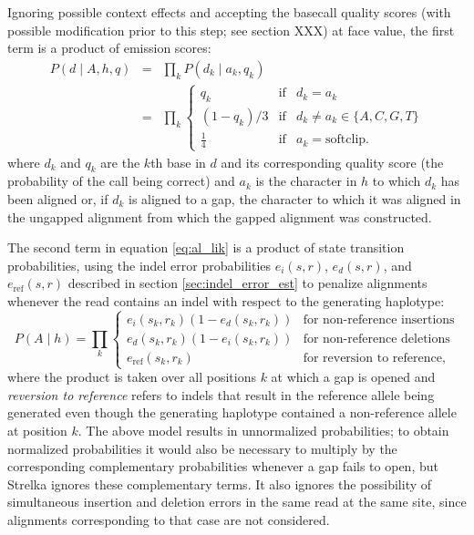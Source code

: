 \documentclass{article}
\begin{document}
Ignoring possible context effects and accepting the basecall quality scores (with possible modification prior to this step; see section XXX) at face value, the first term is a product of emission scores:
\begin{eqnarray*}
P(d \mid A,h,q) & = & \prod_k P(d_k \mid a_k,q_k)\\
& = & \prod_k \left\{
                        \begin{array}{lcl}
                             q_k & \mathrm{if} & d_k=a_k\\
                             (1-q_k)/3 & \mathrm{if} &  d_k \neq a_k \in \{A,C,G,T\}\\
                             \frac{1}{4} & \mathrm{if} & a_k=\mathrm{softclip}.
                        \end{array}
                      \right.
\end{eqnarray*}
where $d_k$ and $q_k$ are the $k$th base in $d$ and its corresponding quality score (the probability of the call being correct) and $a_k$ is the character in $h$ to which $d_k$ has been aligned or, if $d_k$ is aligned to a gap, the character to which it was aligned in the ungapped alignment from which the gapped alignment was constructed.

The second term in equation \ref{eq:al_lik} is a product of state transition probabilities, using the indel error probabilities $e_i(s,r)$, $e_d(s,r)$, and $e_{\text{ref}}(s,r)$ described in section \ref{sec:indel_error_est} to penalize alignments whenever the read contains an indel with respect to the generating haplotype:
\begin{equation*}
\label{eq:transition_probs}
P(A \mid h) = \prod_k \left\{
\begin{array}{ll}
e_i(s_k,r_k)(1-e_d(s_k,r_k)) & \textrm{for~non-reference~insertions}\\
e_d(s_k,r_k)(1-e_i(s_k,r_k)) & \textrm{for~non-reference~deletions}\\
e_{\text{ref}}(s_k,r_k) & \textrm{for~reversion~to~reference},
\end{array}
\right.
\end{equation*}
where the product is taken over all positions $k$ at which a gap is opened and \emph{reversion to reference} refers to indels that result in the reference allele being generated even though the generating haplotype contained a non-reference allele at position $k$. The above model results in unnormalized probabilities; to obtain normalized probabilities it would also be necessary to multiply by the corresponding complementary probabilities whenever a gap fails to open, but Strelka ignores these complementary terms. It also ignores the possibility of simultaneous insertion and deletion errors in the same read at the same site, since alignments corresponding to that case are not considered.
\end{document}
